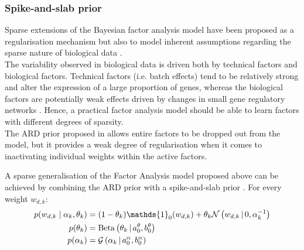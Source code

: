 
\subsubsection{Spike-and-slab prior} \label{section_spikeslab}

Sparse extensions of the Bayesian factor analysis model have been proposed as a regularisation mechanism but also to model inherent assumptions regarding the sparse nature of biological data \cite{Stegle2012,Gao2013}.\\
The variability observed in biological data is driven both by technical factors and biological factors. Technical factors (i.e. batch effects) tend to be relatively strong and alter the expression of a large proportion of genes, whereas the biological factors are potentially weak effects driven by changes in small gene regulatory networks \cite{Gao2013}. Hence, a practical factor analysis model should be able to learn factors with different degrees of sparsity.\\
The ARD prior proposed in  allows entire factors to be dropped out from the model, but it provides a weak degree of regularisation when it comes to inactivating individual weights within the active factors.

A sparse generalisation of the Factor Analysis model proposed above can be achieved by combining the ARD prior with a spike-and-slab prior \cite{Mitchell1988,Titsias2011}. For every weight $w_{d,k}$:
\begin{align}
	p(w_{d,k} \mid \alpha_k,\theta_k) &= (1-\theta_k) \mathds{1}_0(w_{d,k}) + \theta_k \Ndist{w_{d,k}}{0, \alpha_k^{-1}} \\
	p(\theta_k) &= \Bdist{\theta_k}{a_0^\theta,b_0^\theta} \\
	p(\alpha_k) &= \Gdist{\alpha_k}{a_0^\alpha, b_0^\alpha}
\end{align}

